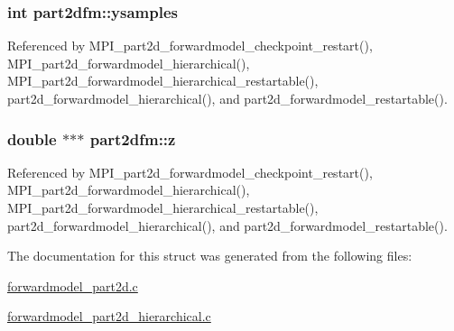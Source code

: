 \subsubsection[{\texorpdfstring{ysamples}{ysamples}}]{\setlength{\rightskip}{0pt plus 5cm}int part2dfm\+::ysamples}\hypertarget{structpart2dfm_a734cb1341cafde5f78fe5703b0ccc431}{}\label{structpart2dfm_a734cb1341cafde5f78fe5703b0ccc431}


Referenced by M\+P\+I\+\_\+part2d\+\_\+forwardmodel\+\_\+checkpoint\+\_\+restart(), M\+P\+I\+\_\+part2d\+\_\+forwardmodel\+\_\+hierarchical(), M\+P\+I\+\_\+part2d\+\_\+forwardmodel\+\_\+hierarchical\+\_\+restartable(), part2d\+\_\+forwardmodel\+\_\+hierarchical(), and part2d\+\_\+forwardmodel\+\_\+restartable().

\subsubsection[{\texorpdfstring{z}{z}}]{\setlength{\rightskip}{0pt plus 5cm}double $\ast$$\ast$$\ast$ part2dfm\+::z}\hypertarget{structpart2dfm_a73279bf493761b119d0eef31b35e4ebd}{}\label{structpart2dfm_a73279bf493761b119d0eef31b35e4ebd}


Referenced by M\+P\+I\+\_\+part2d\+\_\+forwardmodel\+\_\+checkpoint\+\_\+restart(), M\+P\+I\+\_\+part2d\+\_\+forwardmodel\+\_\+hierarchical(), M\+P\+I\+\_\+part2d\+\_\+forwardmodel\+\_\+hierarchical\+\_\+restartable(), part2d\+\_\+forwardmodel\+\_\+hierarchical(), and part2d\+\_\+forwardmodel\+\_\+restartable().



The documentation for this struct was generated from the following files\+:\begin{DoxyCompactItemize}
\item 
\hyperlink{forwardmodel__part2d_8c}{forwardmodel\+\_\+part2d.\+c}\item 
\hyperlink{forwardmodel__part2d__hierarchical_8c}{forwardmodel\+\_\+part2d\+\_\+hierarchical.\+c}\end{DoxyCompactItemize}
